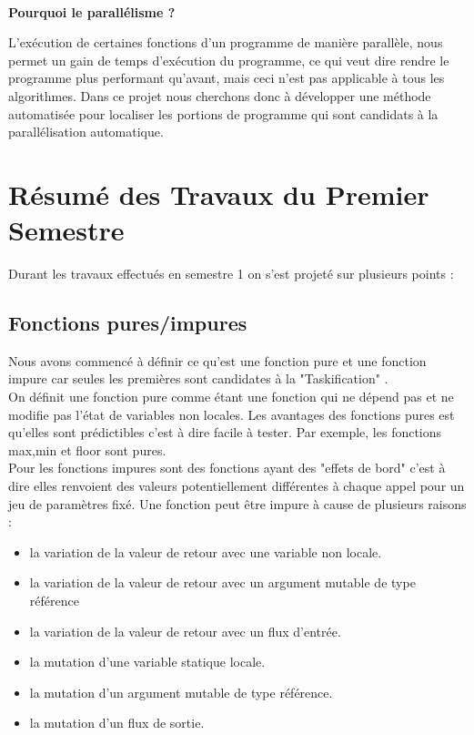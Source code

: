 \documentclass[12pt,a4paper]{article}
\begin{document}
\paragraph{}\textbf{Pourquoi le parallélisme ?}

 L’exécution de  certaines fonctions d'un programme de manière parallèle, nous permet un gain de temps d'exécution du programme, ce qui veut dire rendre le programme plus performant qu'avant, mais ceci n'est pas applicable à tous les algorithmes. Dans ce projet nous cherchons donc à développer une méthode automatisée pour localiser les portions de programme qui sont candidats à la parallélisation automatique.

\section{Résumé des Travaux du Premier Semestre}

Durant les travaux effectués en semestre 1 on s'est projeté sur plusieurs points : 

\subsection{Fonctions pures/impures}
Nous avons commencé à définir ce qu'est une fonction pure et une fonction impure car seules les premières sont candidates à la "Taskification" .\\
On définit une fonction pure comme étant une fonction qui ne dépend pas et ne modifie pas l'état de variables non locales. Les avantages des fonctions pures est qu'elles sont prédictibles c'est à dire facile à tester\cite{avantage}. Par exemple, les fonctions max,min et floor sont pures.\\
Pour les fonctions impures sont des fonctions ayant des "effets de bord" c'est à dire elles renvoient des valeurs potentiellement différentes à chaque appel pour un jeu de paramètres fixé. Une fonction peut être impure à cause de plusieurs raisons \cite{fctimpure}:

    \begin{itemize}
    \item la variation de la valeur de retour avec une variable non locale.
    \item la variation de la valeur de retour avec un argument mutable de type référence
    \item la variation de la valeur de retour avec un flux d’entrée.
    \item la mutation d’une variable statique locale.
    \item la mutation d’un argument mutable de type référence.
    \item la mutation d’un flux de sortie.
\end{itemize}
\end{document}

